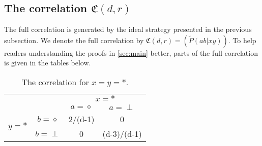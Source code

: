 \documentclass[11pt,letterpaper]{article}
\newcommand{\1}{\mathbb{1}}
\newcommand{\fC}{\mathfrak{C}}
\newcommand{\tpr}[2]{\tilde{P}(#1|#2)}
\theoremstyle{definition}
\begin{document}
\subsection{The correlation $\fC(d,r)$}
\label{sec:cor}
The full correlation is generated by the ideal strategy presented in the previous subsection.
We denote the full correlation by $\fC(d,r) = ( \tpr{ab}{xy} )$.
To help readers understanding the proofs in \cref{sec:main} better, 
parts of the full correlation is given in the tables below.
\begin{table}[H]
\begin{center}
\begin{tabular}{|c|c||c|c|}
\hline
\multicolumn{2}{|c|}{} &
\multicolumn{2}{|c|}{$x=\ast$}\\
\cline{3-4}
\multicolumn{2}{|c|}{} &$a = \diamond$ & $a = \perp$ \\
\hline
\hline
\multirow{2}{*}{$y = \ast$} & $b=\diamond$ & 2/(d-1) & 0 \\
\cline{2-4}
&$b=\perp$ & 0 & (d-3)/(d-1) \\
\hline
\end{tabular}
\caption{The correlation for $x=y=\ast$.}
\end{center}
\end{table}
\end{document}
